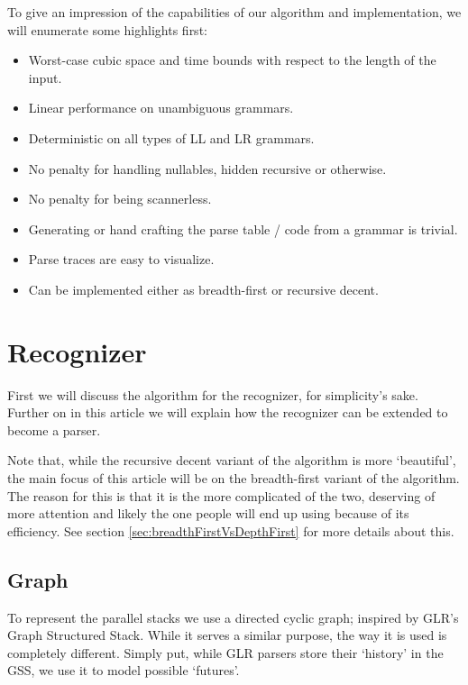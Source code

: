 \documentclass[a4paper,10pt]{article}
\begin{document}
To give an impression of the capabilities of our algorithm and implementation, we will enumerate some highlights first:
\begin{itemize}
 \setlength{\itemsep}{0pt}
 \setlength{\parskip}{0pt}
 \setlength{\parsep}{0pt}
 
 \item Worst-case cubic space and time bounds with respect to the length of the input.
 \item Linear performance on unambiguous grammars.
 \item Deterministic on all types of LL and LR grammars.
 \item No penalty for handling nullables, hidden recursive or otherwise.
 \item No penalty for being scannerless.
 \item Generating or hand crafting the parse table / code from a grammar is trivial.
 \item Parse traces are easy to visualize.
 \item Can be implemented either as breadth-first or recursive decent.
\end{itemize}

\section{Recognizer}

First we will discuss the algorithm for the recognizer, for simplicity's sake. Further on in this article we will explain how the recognizer can be extended to become a parser.

Note that, while the recursive decent variant of the algorithm is more `beautiful', the main focus of this article will be on the breadth-first variant of the algorithm. The reason for this is that it is the more complicated of the two, deserving of more attention and likely the one people will end up using because of its efficiency. See section \ref{sec:breadthFirstVsDepthFirst} for more details about this.

\subsection{Graph}

To represent the parallel stacks we use a directed cyclic graph; inspired by GLR's Graph Structured Stack. While it serves a similar purpose, the way it is used is completely different. Simply put, while GLR parsers store their `history' in the GSS, we use it to model possible `futures'.
\end{document}
